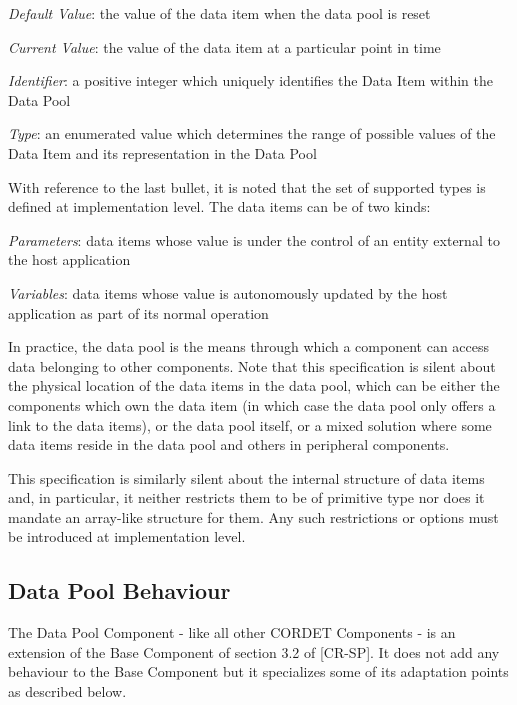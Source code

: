 \documentclass[a4paper,10pt]{article}
\newenvironment{fw_itemize}						%
{\begin{itemize}
  \setlength{\itemsep}{1mm}
  \setlength{\parskip}{0pt}
  \setlength{\parsep}{0pt}}
{\end{itemize}}
\begin{document}
\begin{fw_itemize}
\item \textit{Default Value}: the value of the data item when the data pool is reset
\item \textit{Current Value}: the value of the data item at a particular point in time
\item \textit{Identifier}: a positive integer which uniquely identifies the Data Item within the Data Pool
\item \textit{Type}: an enumerated value which determines the range of possible values of the Data Item and its representation in the Data Pool
\end{fw_itemize}

With reference to the last bullet, it is noted that the set of supported types is defined at implementation level. The data items can be of two kinds:

\begin{fw_itemize}
\item \textit{Parameters}: data items whose value is under the control of an entity external to the host application 
\item \textit{Variables}: data items whose value is autonomously updated by the host application as part of its normal operation
\end{fw_itemize}

In practice, the data pool is the means through which a component can access data belonging to other components. Note that this specification is silent about the physical location of the data items in the data pool, which can be either the components which own the data item (in which case the data pool only offers a link to the data items), or the data pool itself, or a mixed solution where some data items reside in the data pool and others in peripheral components. 

This specification is similarly silent about the internal structure of data items and, in particular, it neither restricts them to be of primitive type nor does it mandate an array-like structure for them. Any such restrictions or options must be introduced at implementation level.

\subsection{Data Pool Behaviour}\label{sec:dpBehaviour}
The Data Pool Component - like all other CORDET Components - is an extension of the Base Component of section 3.2 of [CR-SP]. It does not add any behaviour to the Base Component but it specializes some of its adaptation points as described below.
\end{document}
